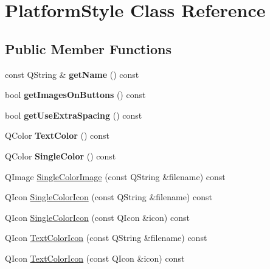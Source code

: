 \hypertarget{class_platform_style}{}\section{Platform\+Style Class Reference}
\label{class_platform_style}
\subsection*{Public Member Functions}
\begin{DoxyCompactItemize}
\item 
\mbox{\label{class_platform_style_a0f1f0292263509c1585d35e9268694d3}} 
const Q\+String \& {\bfseries get\+Name} () const
\item 
\mbox{\label{class_platform_style_ab1c3a5c2bc7b5ff91d3e166fee62eea5}} 
bool {\bfseries get\+Images\+On\+Buttons} () const
\item 
\mbox{\label{class_platform_style_a67b6942f6dcf2ca765f8af2d6f377ce8}} 
bool {\bfseries get\+Use\+Extra\+Spacing} () const
\item 
\mbox{\label{class_platform_style_ad9c6683d8af86105edcb53970b689afb}} 
Q\+Color {\bfseries Text\+Color} () const
\item 
\mbox{\label{class_platform_style_a76949291f8dfc8b7a34f90cf119ed8e4}} 
Q\+Color {\bfseries Single\+Color} () const
\item 
Q\+Image \mbox{\hyperlink{class_platform_style_adecebc4670880700203340d322351f89}{Single\+Color\+Image}} (const Q\+String \&filename) const
\item 
Q\+Icon \mbox{\hyperlink{class_platform_style_a3f4ff8b7a2054cbd4283e67208523035}{Single\+Color\+Icon}} (const Q\+String \&filename) const
\item 
Q\+Icon \mbox{\hyperlink{class_platform_style_af2ff6ee24cd5745b34a945afecdf41f7}{Single\+Color\+Icon}} (const Q\+Icon \&icon) const
\item 
Q\+Icon \mbox{\hyperlink{class_platform_style_ac3c91893b60a84a98155b7b9603918bd}{Text\+Color\+Icon}} (const Q\+String \&filename) const
\item 
Q\+Icon \mbox{\hyperlink{class_platform_style_adf1b4129d4d6ccff590d202b95718892}{Text\+Color\+Icon}} (const Q\+Icon \&icon) const
\end{DoxyCompactItemize}
